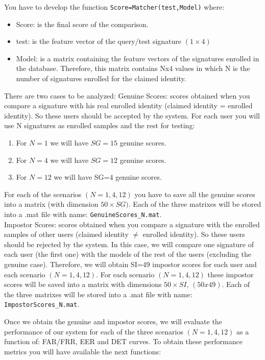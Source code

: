 \documentclass[a4paper]{article}
\def\inline{\lstinline[basicstyle=\ttfamily,keywordstyle={}]}
\begin{document}
{You have to develop the function \inline{Score=Matcher(test,Model)} where:
\begin{itemize}
\item	Score: is the final score of the comparison.
\item	test: is the feature vector of the query/test signature \((1\times4)\)
\item	Model: is a matrix containing the feature vectors of the signatures enrolled in the database. Therefore, this matrix contains Nx4 values in which N is the number of signatures enrolled for the claimed identity.
\end{itemize}
There are two cases to be analyzed:
Genuine Scores: scores obtained when you compare a signature with his real enrolled identity (claimed identity = enrolled identity). So these users should be accepted by the system. For each user you will use N signatures as enrolled samples and the rest for testing:
\begin{enumerate}
\item	For \(N=1\) we will have \(SG=15\) genuine scores.
\item	For \(N=4\) we will have \(SG=12\) genuine scores.
\item	For \(N=12\) we will have SG=4 genuine scores.
\end{enumerate}
For each of the scenarios \((N=1,4,12)\) you have to save all the genuine scores into a matrix (with dimension \(50 \times SG)\). Each of the three matrixes will be stored into a .mat file with name: \inline{GenuineScores_N.mat}.\\

Impostor Scores: scores obtained when you compare a signature with the enrolled samples of other users (claimed identity $\neq$ enrolled identity). So these users should be rejected by the system. In this case, we will compare one signature of each user (the first one) with the models of the rest of the users (excluding the genuine case). Therefore, we will obtain SI=49 impostor scores for each user and each scenario \((N=1,4,12)\).
For each scenario \((N=1,4,12)\) these impostor scores will be saved into a matrix with dimensions \(50\times SI\), \((50x49)\). Each of the three matrixes will be stored into a .mat file with name: \inline{ImpostorScores_N.mat}.

Once we obtain the genuine and impostor scores, we will evaluate the performance of our system for each of the three scenarios \((N=1,4,12)\) as a function of: FAR/FRR, EER and DET curves.
To obtain these performance metrics you will have available the next functions:



}
\end{document}
